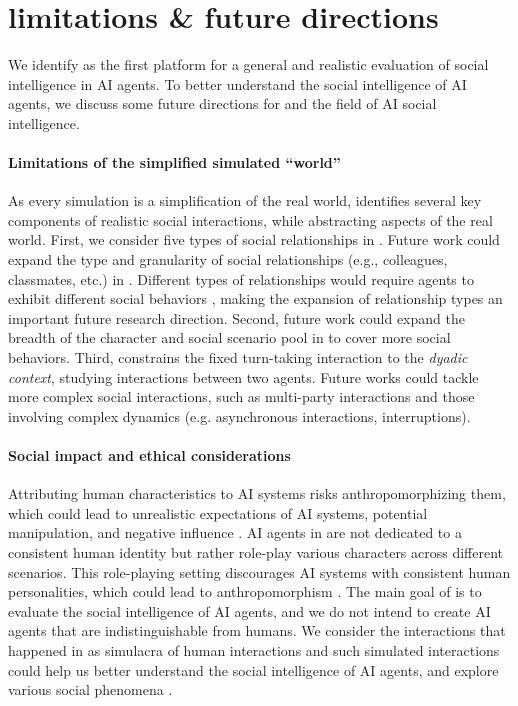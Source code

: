 \section{limitations \& future directions}
\label{sec:limitations}
We identify \sotopia as the first platform for a general and realistic evaluation of social intelligence in AI agents.
To better understand the social intelligence of AI agents, we discuss some future directions for \sotopia and the field of AI social intelligence.

\paragraph{Limitations of the simplified simulated ``world''} 
As every simulation is a simplification of the real world, \sotopia identifies several key components of realistic social interactions, while abstracting aspects of the real world.
First, we consider five types of social relationships in \sotopia. Future work could expand the type and granularity of social relationships (e.g., colleagues, classmates, etc.) in \sotopia. Different types of relationships would require agents to exhibit different social behaviors \citep{Jenkins2018-uw}, making the expansion of relationship types an important future research direction. 
Second, future work could expand the breadth of the character and social scenario pool in \sotopia to cover more social behaviors.
Third, \sotopia constrains the fixed turn-taking interaction to the \textit{dyadic context}, studying interactions between two agents. Future works could tackle more complex social interactions, such as multi-party interactions and those involving complex dynamics (e.g. asynchronous interactions, interruptions).



\paragraph{Social impact and ethical considerations}
Attributing human characteristics to AI systems risks anthropomorphizing them, which could lead to unrealistic expectations of AI systems, potential manipulation, and negative influence \citep{deshpande2023anthropomorphization}.
AI agents in \sotopia are not dedicated to a consistent human identity but rather role-play various characters across different scenarios.
This role-playing setting discourages AI systems with consistent human personalities, which could lead to anthropomorphism \citep{shanahan2023roleplay}.
The main goal of \sotopia is to evaluate the social intelligence of AI agents, and we do not intend to create AI agents that are indistinguishable from humans.
We consider the interactions that happened in \sotopia as simulacra of human interactions and such simulated interactions could help us better understand the social intelligence of AI agents, and explore various social phenomena \citep{Park2023GenerativeAI}.


